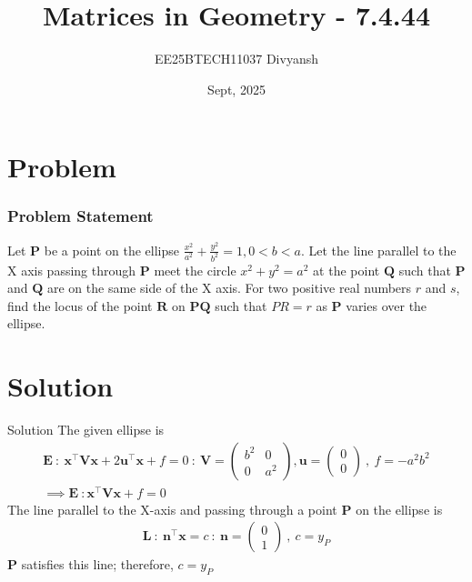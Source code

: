 \documentclass{beamer}
\title{Matrices in Geometry - 7.4.44}
\author{EE25BTECH11037  Divyansh}
\date{Sept, 2025}
\let\vec\mathbf
\theoremstyle{remark}
\newcommand{\myvec}[1]{\ensuremath{\begin{pmatrix}#1\end{pmatrix}}}
\begin{document}
\maketitle


\section{Problem}
\begin{frame}
\frametitle{Problem Statement}
Let $\vec{P}$ be a point on the ellipse $\frac{x^2}{a^2} + \frac{y^2}{b^2}=1 , 0<b<a$. Let the line parallel to the X axis passing through $\vec{P}$ meet the circle $x^2 + y^2= a^2$ at the point $\vec{Q}$ such that $\vec{P}$ and $\vec{Q}$ are on the same side of the X axis. For two positive real numbers $r$ and $s$, find the locus of the point $\vec{R}$ on $\vec{P}\vec{Q}$ such that $PR = r$ as $\vec{P}$ varies over the ellipse.
\end{frame}

\section{Solution}
\begin{frame}{Solution}
The given ellipse is 
\begin{align}
    \vec{E} \ : \ \vec{x}^{\top}\vec{V}\vec{x} + 2 \vec{u}^{\top}\vec{x} + f=0 \ : \ \vec{V}=\myvec{b^2 & 0 \\ 0 & a^2}, \vec{u}=\myvec{0\\0}\ , \ f=-a^2b^2 \\
    \implies \vec{E} \ : \vec{x}^{\top}\vec{V}\vec{x} + f=0
\end{align}
The line parallel to the X-axis and passing through a point $\vec{P}$ on the ellipse is 
\begin{align}
    \vec{L}\ :\ \vec{n}^{\top} \vec{x} =c \ : \ \vec{n}=\myvec{0\\1} \ , \ c=y_P
\end{align}
$\vec{P}$ satisfies this line; therefore, $c=y_P$

\end{frame}
\end{document}
